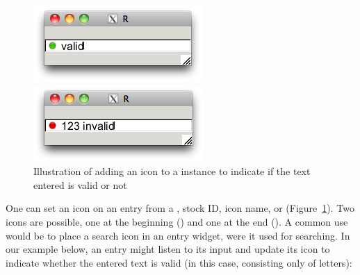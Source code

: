 \begin{figure}
  \centering
  \begin{minipage}[c]{.45\linewidth}
    \includegraphics[width=\textwidth]{fig-RGtk2-valid-entry.png}\quad
 \end{minipage}\quad
 \begin{minipage}[c]{.45\linewidth}
   \includegraphics[width=\textwidth]{fig-RGtk2-invalid-entry.png}
 \end{minipage}
 \caption{Illustration of adding an icon to a  instance to indicate if the text entered is valid or not}
  \label{fig:RGtk2-valid-gtkentry}
\end{figure}


One can set an icon on an entry from a , stock ID,
icon name, or 
(Figure~\ref{fig:RGtk2-valid-gtkentry}). Two icons are possible, one
at the beginning () and one at the end
(). A common use would be to place a search icon in an
entry widget, were it used for searching. In our example below, an
entry might listen to its input and update its icon to indicate
whether the entered text is valid (in this case, consisting only of
letters):

